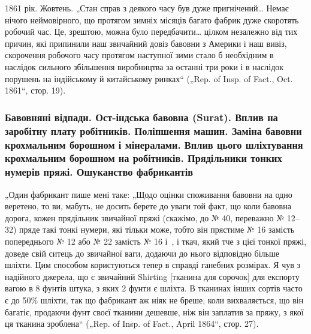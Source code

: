 
1861 рік. Жовтень. „Стан справ з деякого часу був дуже
пригнічений\dots{} Немає нічого неймовірного, що протягом зимніх
місяців багато фабрик дуже скоротять робочий час. Це, зрештою,
можна було передбачити\dots{} цілком незалежно від тих причин,
які припинили наш звичайний довіз бавовни з Америки і наш вивіз,
скорочення робочого часу протягом наступної зими стало б
необхідним в наслідок сильного збільшення виробництва за
останні три роки і в наслідок порушень на індійському й китайському
ринках“ („Rep. of Insp. of Fact., Oct. 1861“, стор. 19).

\subsubsection{Бавовняні відпади. Ост-індська бавовна (Surat). Вплив на заробітну плату
робітників. Поліпшення машин. Заміна бавовни крохмальним борошном і
мінералами. Вплив цього шліхтування крохмальним борошном на робітників.
Прядільники тонких нумерів пряжі. Ошуканство фабрикантів}

„Один фабрикант пише мені таке: „Щодо оцінки споживання
бавовни на одно веретено, то ви, мабуть, не досить берете до
уваги той факт, що коли бавовна дорога, кожен прядільник
звичайної пряжі (скажімо, до № 40, переважно № 12--32) пряде
такі тонкі нумери, які тільки може, тобто він прястиме № 16
замість попереднього № 12 або № 22 замість № 16 і~,
і ткач, який тче з цієї тонкої пряжі, доведе свій ситець до
звичайної ваги, додаючи до нього відповідно більше шліхти.
Цим способом користуються тепер в справді ганебних розмірах.
Я чув з надійного джерела, що є звичайний Shirting [тканина
для сорочок] для експорту вагою в 8 фунтів штука, з яких
2 фунти є шліхта. В тканинах інших сортів часто є до 50\%
шліхти, так що фабрикант аж ніяк не бреше, коли вихваляється,
що він багатіє, продаючи фунт своєї тканини дешевше, ніж він
заплатив за пряжу, з якої ця тканина зроблена“ („Rep. of Insp.
of Fact., April 1864“, стор. 27).

